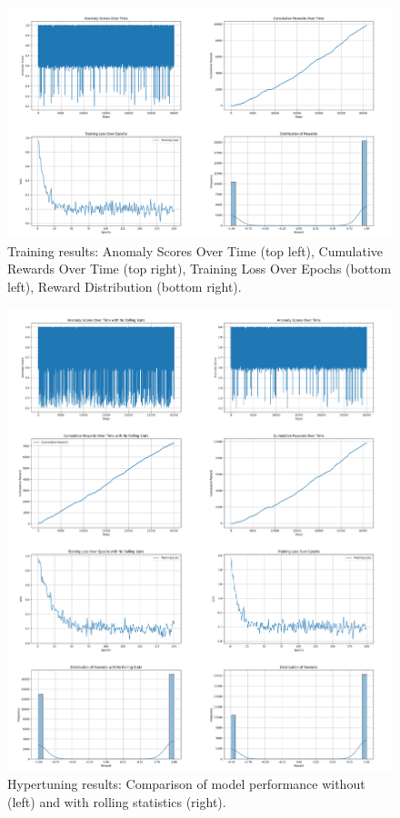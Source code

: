\documentclass[conference]{IEEEtran}
\begin{document}
\begin{figure}[H]
    \centering
    \includegraphics[scale=0.132]{./figures/training_results.png}
    \caption{Training results: Anomaly Scores Over Time (top left), Cumulative Rewards Over Time (top right), Training Loss Over Epochs (bottom left), Reward Distribution (bottom right).}
    \label{fig:training_results}
\end{figure}

\begin{figure}[H]
    \centering
    \includegraphics[scale=0.132]{./figures/hypertuning_results.png}
    \caption{Hypertuning results: Comparison of model performance without (left) and with rolling statistics (right).}
    \label{fig:hypertuning_results}
\end{figure}
\end{document}
